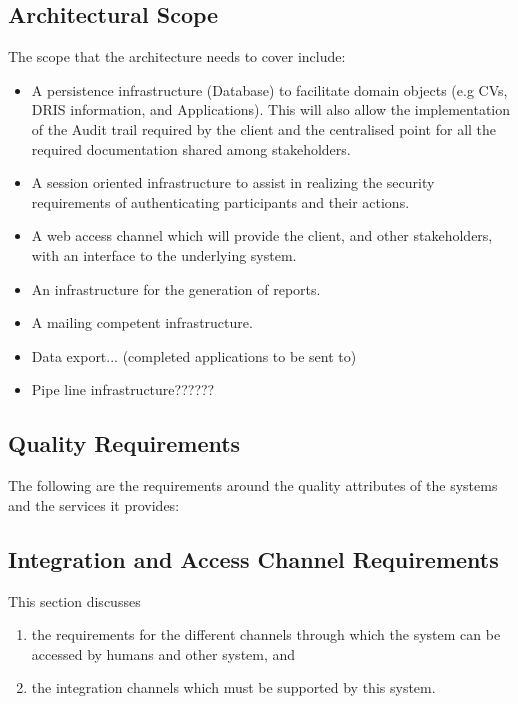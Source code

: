 \documentclass[12pt]{article}
\begin{document}
\subsection{Architectural Scope}
The scope that the architecture needs to cover include:
\begin{itemize}
\item A persistence infrastructure (Database) to facilitate domain objects (e.g CVs, DRIS information, and Applications). This will also allow the implementation of the Audit trail required by the client and the centralised point for all the required documentation shared among stakeholders.
\item A session oriented infrastructure to assist in realizing the security requirements of authenticating participants and their actions.
\item A web access channel which will provide the client, and other stakeholders, with an interface to the underlying system.
\item An infrastructure for the generation of reports.
\item A mailing competent infrastructure.
\item Data export... (completed applications to be sent to)
\item Pipe line infrastructure??????
\end{itemize}

\subsection{Quality Requirements} 
\vspace{0.2in}
The following are the requirements around the quality attributes of the systems and the services it provides:



\subsection{Integration and Access Channel Requirements}
This section discusses 
\begin{enumerate}
\item the requirements for the different channels through which the system can be accessed by humans and other system, and
\item the integration channels which must be supported by this system.
\end{enumerate}
\end{document}

